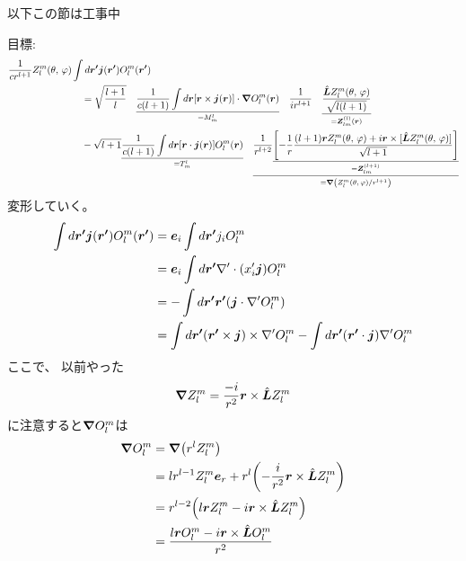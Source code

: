 \documentclass[../../master.tex]{subfiles}
\begin{document}
\clearpage
以下この節は工事中

目標:
\begin{align}
    \frac{1}{cr^{l+1}} Z_l^m(\theta,\,\varphi) &\int d\vb*{r'} \vb*{j}(\vb*{r'}) O_l^{m}(\vb*{r'})\notag\\
    &\quad=\sqrt{\frac{l+1}{l}}\quad\underset{=M_m^l}{\underline{\frac{1}{c(l+1)}\int d\vb*{r}[\vb*{r}\times \vb*{j}(\vb*{r})]\cdot \grad O_l^m(\vb*{r})}}
    \quad\frac{1}{ir^{l+1}}\quad\underset{=\vb*{Z}_{lm}^{(l)}(\vb*{r})}{\underline{\frac{\hat{\vb*{L}}Z_l^m(\theta,\,\varphi)}{\sqrt{l(l+1)}}}}\notag\\
    &\quad-\sqrt{l+1}\underset{=T_m^l}{\underline{\frac{1}{c(l+1)}\int d\vb*{r}[\vb*{r}\cdot \vb*{j}(\vb*{r})] O_l^m(\vb*{r})}}
    \quad\underset{=\grad(Z_l^m(\theta,\,\varphi)/r^{l+1})}{\underline{\frac{1}{r^{l+2}}\underset{=\vb*{Z}_{lm}^{(l+1)}}{\underline{\qty[-\frac{1}{r}\frac{(l+1)\vb*{r}Z_l^m(\theta,\,\varphi)+i\vb*{r}\times [\hat{\vb*{L}}Z_l^m(\theta,\,\varphi)]}{\sqrt{l+1}}]}}}}
\end{align}
変形していく。
\begin{align}
    \int d\vb*{r'} \vb*{j}(\vb*{r'}) O_l^{m}(\vb*{r'})
    &= \vb*{e}_i \int d\vb*{r'} j_i O_l^{m}\\
    &= \vb*{e}_i \int d\vb*{r'} \nabla'\cdot(x_i' \vb*{j}) O_l^m\\
    &= -\int d\vb*{r'} \vb*{r'} (\vb*{j}\cdot \nabla' O_l^m)\\
    &= \int d\vb*{r'} (\vb*{r'}\times\vb*{j})\times \nabla' O_l^m - \int d\vb*{r'} (\vb*{r'}\cdot\vb*{j})\nabla'O_l^m
\end{align}
ここで、
以前やった
\begin{equation}
    \grad Z_l^m = \frac{-i}{r^2}\vb*{r}\times \hat{\vb*{L}}Z_l^m
\end{equation}
に注意すると\(\grad O_l^m\)は
\begin{align}
    \grad O_l^m
    &= \grad(r^l Z_l^m)\\
    &= lr^{l-1}Z_l^m \vb*{e}_r +r^l\qty(-\frac{i}{r^2}\vb*{r}\times \hat{\vb*{L}}Z_l^m)\\
    &= r^{l-2}\qty(l\vb*{r}Z_l^m-i\vb*{r}\times\hat{\vb*{L}}Z_l^m)\\
    &=\frac{l\vb*{r}O_l^m-i\vb*{r}\times \hat{\vb*{L}}O_l^m}{r^2}
\end{align}
\end{document}

